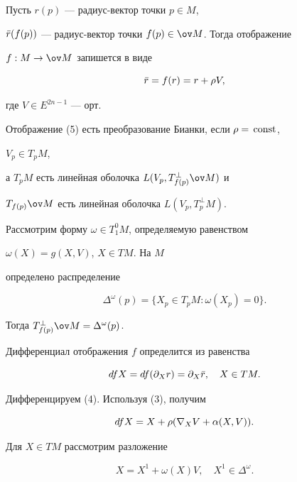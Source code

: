  


Пусть $r(p)$ --- радиус-вектор точки $p\in M$, 


$\Bar r(f(p))$ --- радиус-вектор точки $f(p)\in{\ov M}$. Тогда отображение 


$f:M\to{\ov M}$ запишется в виде 


\begin{equation} 


\Bar r=f(r)=r+\rho V, 


\end{equation} 


где $V\in E^{2n-1}$ --- орт. 


 


Отображение (5) есть преобразование Бианки, если $\rho=\text{\,const}$, 


$V_p\in T_pM$, 


а $T_pM$ есть линейная оболочка $L(V_p,T^\bot_{f(p)}\ov M)$ и 


$T_{f(p)}\ov M$ есть линейная оболочка $L(V_p,T^\bot_pM)$. 


 


Рассмотрим форму $\omega\in T^0_1M$, определяемую равенством 


$\omega(X)=g(X,V)$, $X\in TM$. На $M$ 


определено распределение 


$$ 


\Delta^\omega(p)=\{X_p\in T_pM:\omega(X_p)=0\}. 


$$ 


Тогда $T^\bot_{f(p)}\ov M=\Delta^\omega(p)$. 


 


Дифференциал отображения $f$ определится из равенства 


$$ 


dfX=df(\partial_Xr)=\partial_X\Bar r,\quad X\in TM. 


$$ 


Дифференцируем (4). Используя (3), получим 


$$ 


dfX=X+\rho(\na_XV+\alpha(X,V)). 


$$ 


Для $X\in TM$ рассмотрим разложение 


$$ 


X=X^1+\omega(X)V,\quad X^1\in \Delta^\omega. 


$$ 


